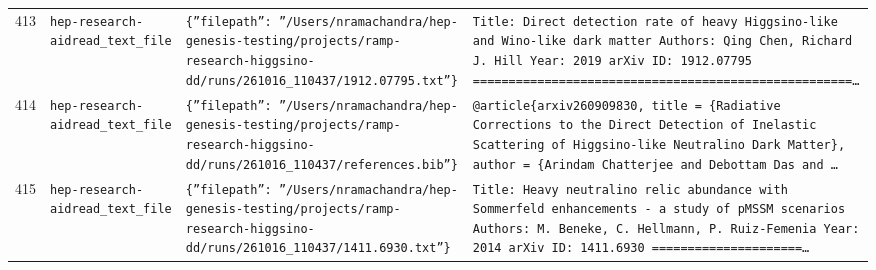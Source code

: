 \documentclass[11pt,a4paper]{article}
\begin{document}
\begin{longtable}{@{}p{}p{}p{}p{}@{}}
413 & \texttt{hep-research-aid}\newline\texttt{read\_\allowbreak{}text\_\allowbreak{}file} & \texttt{\{''filepath'':\allowbreak{} ''/\allowbreak{}Users/\allowbreak{}nramachandra/\allowbreak{}hep-genesis-testing/\allowbreak{}projects/\allowbreak{}ramp-research-higgsino-dd/\allowbreak{}runs/\allowbreak{}261016\_\allowbreak{}110437/\allowbreak{}1912.07795.txt''\}\allowbreak{}} & \texttt{Title:\allowbreak{} Direct detection rate of heavy Higgsino-like and Wino-like dark matter Authors:\allowbreak{} Qing Chen,\allowbreak{} Richard J. Hill Year:\allowbreak{} 2019 arXiv ID:\allowbreak{} 1912.07795  =\allowbreak{}=\allowbreak{}=\allowbreak{}=\allowbreak{}=\allowbreak{}=\allowbreak{}=\allowbreak{}=\allowbreak{}=\allowbreak{}=\allowbreak{}=\allowbreak{}=\allowbreak{}=\allowbreak{}=\allowbreak{}=\allowbreak{}=\allowbreak{}=\allowbreak{}=\allowbreak{}=\allowbreak{}=\allowbreak{}=\allowbreak{}=\allowbreak{}=\allowbreak{}=\allowbreak{}=\allowbreak{}=\allowbreak{}=\allowbreak{}=\allowbreak{}=\allowbreak{}=\allowbreak{}=\allowbreak{}=\allowbreak{}=\allowbreak{}=\allowbreak{}=\allowbreak{}=\allowbreak{}=\allowbreak{}=\allowbreak{}=\allowbreak{}=\allowbreak{}=\allowbreak{}=\allowbreak{}=\allowbreak{}=\allowbreak{}=\allowbreak{}=\allowbreak{}=\allowbreak{}=\allowbreak{}=\allowbreak{}=\allowbreak{}=\allowbreak{}=\allowbreak{}=\allowbreak{}\ldots{}\allowbreak{}} \\
414 & \texttt{hep-research-aid}\newline\texttt{read\_\allowbreak{}text\_\allowbreak{}file} & \texttt{\{''filepath'':\allowbreak{} ''/\allowbreak{}Users/\allowbreak{}nramachandra/\allowbreak{}hep-genesis-testing/\allowbreak{}projects/\allowbreak{}ramp-research-higgsino-dd/\allowbreak{}runs/\allowbreak{}261016\_\allowbreak{}110437/\allowbreak{}references.bib''\}\allowbreak{}} & \texttt{@article\{arxiv260909830,\allowbreak{}   title =\allowbreak{} \{Radiative Corrections to the Direct Detection of Inelastic Scattering of Higgsino-like Neutralino Dark Matter\}\allowbreak{},\allowbreak{}   author =\allowbreak{} \{Arindam Chatterjee and Debottam Das and \ldots{}\allowbreak{}} \\
415 & \texttt{hep-research-aid}\newline\texttt{read\_\allowbreak{}text\_\allowbreak{}file} & \texttt{\{''filepath'':\allowbreak{} ''/\allowbreak{}Users/\allowbreak{}nramachandra/\allowbreak{}hep-genesis-testing/\allowbreak{}projects/\allowbreak{}ramp-research-higgsino-dd/\allowbreak{}runs/\allowbreak{}261016\_\allowbreak{}110437/\allowbreak{}1411.6930.txt''\}\allowbreak{}} & \texttt{Title:\allowbreak{} Heavy neutralino relic abundance with Sommerfeld enhancements - a study of pMSSM scenarios Authors:\allowbreak{} M. Beneke,\allowbreak{} C. Hellmann,\allowbreak{} P. Ruiz-Femenia Year:\allowbreak{} 2014 arXiv ID:\allowbreak{} 1411.6930  =\allowbreak{}=\allowbreak{}=\allowbreak{}=\allowbreak{}=\allowbreak{}=\allowbreak{}=\allowbreak{}=\allowbreak{}=\allowbreak{}=\allowbreak{}=\allowbreak{}=\allowbreak{}=\allowbreak{}=\allowbreak{}=\allowbreak{}=\allowbreak{}=\allowbreak{}=\allowbreak{}=\allowbreak{}=\allowbreak{}=\allowbreak{}\ldots{}\allowbreak{}} \\

\end{longtable}
\end{document}
